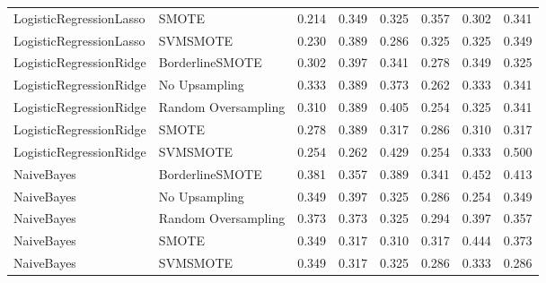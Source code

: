 \begin{tabular}{llllllll}
     LogisticRegressionLasso &               SMOTE &     0.214 &                     0.349 &                 0.325 &                  0.357 &                                   0.302 &    0.341 \\
     LogisticRegressionLasso &            SVMSMOTE &     0.230 &                     0.389 &                 0.286 &                  0.325 &                                   0.325 &    0.349 \\
     LogisticRegressionRidge &     BorderlineSMOTE &     0.302 &                     0.397 &                 0.341 &                  0.278 &                                   0.349 &    0.325 \\
     LogisticRegressionRidge &       No Upsampling &     0.333 &                     0.389 &                 0.373 &                  0.262 &                                   0.333 &    0.341 \\
     LogisticRegressionRidge & Random Oversampling &     0.310 &                     0.389 &                 0.405 &                  0.254 &                                   0.325 &    0.341 \\
     LogisticRegressionRidge &               SMOTE &     0.278 &                     0.389 &                 0.317 &                  0.286 &                                   0.310 &    0.317 \\
     LogisticRegressionRidge &            SVMSMOTE &     0.254 &                     0.262 &                 0.429 &                  0.254 &                                   0.333 &    0.500 \\
                  NaiveBayes &     BorderlineSMOTE &     0.381 &                     0.357 &                 0.389 &                  0.341 &                                   0.452 &    0.413 \\
                  NaiveBayes &       No Upsampling &     0.349 &                     0.397 &                 0.325 &                  0.286 &                                   0.254 &    0.349 \\
                  NaiveBayes & Random Oversampling &     0.373 &                     0.373 &                 0.325 &                  0.294 &                                   0.397 &    0.357 \\
                  NaiveBayes &               SMOTE &     0.349 &                     0.317 &                 0.310 &                  0.317 &                                   0.444 &    0.373 \\
                  NaiveBayes &            SVMSMOTE &     0.349 &                     0.317 &                 0.325 &                  0.286 &                                   0.333 &    0.286 \\

\end{tabular}
